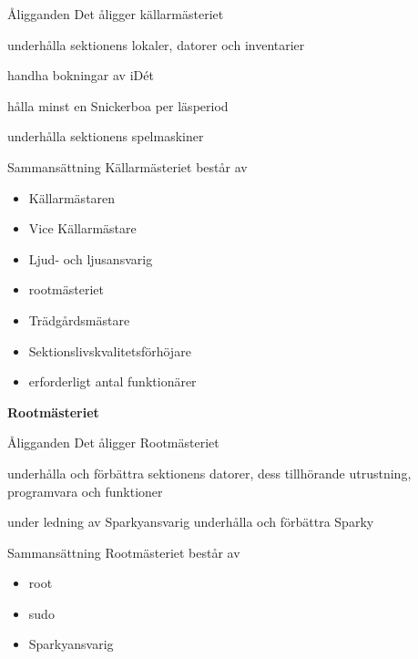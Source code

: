 \documentclass[pdfbookmarks,a4paper,11pt]{article}
\newlength{\itemcollength}
\newenvironment{reglemlista}{%
  \begin{list}{}{%
      \setlength{\labelwidth}{\itemcollength}%
      \setlength{\leftmargin}{\labelwidth + \labelsep}%
      \renewcommand{\makelabel}[1]{%
        \raisebox{0pt}[1ex][0pt]{%
          \makebox[\labelwidth][l]{%
            \parbox[t]{\itemcollength}{%
              \raggedright\hspace{0pt}##1}}}\hfill}%
      }}{%
  \end{list}}
\begin{document}
\begin{reglemlista}

	\item[Åligganden]
	Det åligger källarmästeriet
	\begin{attlista}
		\item underhålla sektionens lokaler, datorer och inventarier
		\item handha bokningar av iDét
		\item hålla minst en Snickerboa per läsperiod
		\item underhålla sektionens spelmaskiner
	\end{attlista}


	\item[Sammansättning]
	Källarmästeriet består av
	\begin{itemize}
		\item Källarmästaren
		\item Vice Källarmästare
		\item Ljud- och ljusansvarig
		\item rootmästeriet
		\item Trädgårdsmästare
		\item Sektionslivskvalitetsförhöjare
		\item erforderligt antal funktionärer
	\end{itemize}

	\item[\textbf{Rootmästeriet}]

	\item[Åligganden]
	Det åligger Rootmästeriet
	\begin{attlista}
		\item underhålla och förbättra sektionens datorer, dess tillhörande utrustning, programvara och funktioner
		\item under ledning av Sparkyansvarig underhålla och förbättra Sparky
	\end{attlista}

	\item[Sammansättning]
	Rootmästeriet består av
	\begin{itemize}
		\item root
		\item sudo
		\item Sparkyansvarig
	\end{itemize}

\end{reglemlista}
\end{document}
